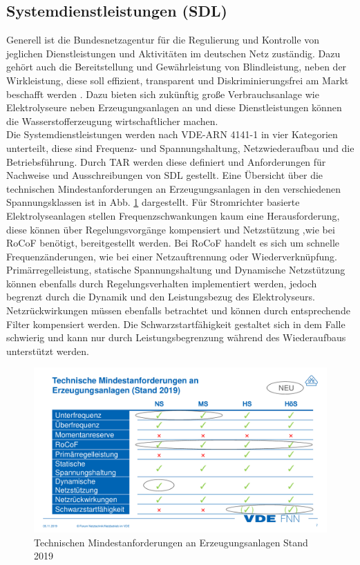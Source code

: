 	\subsection{Systemdienstleistungen (SDL)}
	Generell ist die Bundesnetzagentur für die Regulierung und Kontrolle von jeglichen Dienstleistungen und Aktivitäten im deutschen Netz zuständig. Dazu gehört auch die Bereitstellung und Gewährleistung von Blindleistung, neben der Wirkleistung, diese soll effizient, transparent und Diskriminierungsfrei am Markt beschafft werden \cite{Bundesnetzagentur}. Dazu bieten sich zukünftig große Verbrauchsanlage wie Elektrolyseure neben Erzeugungsanlagen an und diese Dienstleistungen können die Wasserstofferzeugung wirtschaftlicher machen.\\
	 Die Systemdienstleistungen werden nach VDE-ARN 4141-1 in vier Kategorien unterteilt, diese sind Frequenz- und Spannungshaltung, Netzwiederaufbau und die Betriebsführung. Durch \gls{TAR} werden diese definiert und Anforderungen für Nachweise und Ausschreibungen von \gls{SDL} gestellt. Eine Übersicht über die technischen Mindestanforderungen an Erzeugungsanlagen in den verschiedenen Spannungsklassen ist in Abb. \ref{fig:vde-fnn-tar} dargestellt. Für Stromrichter basierte Elektrolyseanlagen stellen Frequenzschwankungen kaum eine Herausforderung, diese können über Regelungsvorgänge kompensiert und Netzstützung ,wie bei \gls{RoCoF} benötigt, bereitgestellt werden. Bei \gls{RoCoF} handelt es sich um schnelle Frequenzänderungen, wie bei einer Netzauftrennung oder Wiederverknüpfung. Primärregelleistung, statische Spannungshaltung und Dynamische Netzstützung können ebenfalls durch Regelungsverhalten implementiert werden, jedoch begrenzt durch die Dynamik und den Leistungsbezug des Elektrolyseurs. Netzrückwirkungen müssen ebenfalls betrachtet und können durch entsprechende Filter kompensiert werden. Die Schwarzstartfähigkeit gestaltet sich in dem Falle schwierig und kann nur durch Leistungsbegrenzung während des Wiederaufbaus unterstützt werden.
	\begin{figure}
		\centering
		\includegraphics[width=0.9\linewidth]{content/Grafiken/VDE-FNN-TAR}
		\caption[Technischen Mindestanforderungen an Erzeugungsanlagen Stand 2019]{Technischen Mindestanforderungen an Erzeugungsanlagen Stand 2019 \cite{VDEFNN2019SDL}}
		\label{fig:vde-fnn-tar}
	\end{figure}
	
